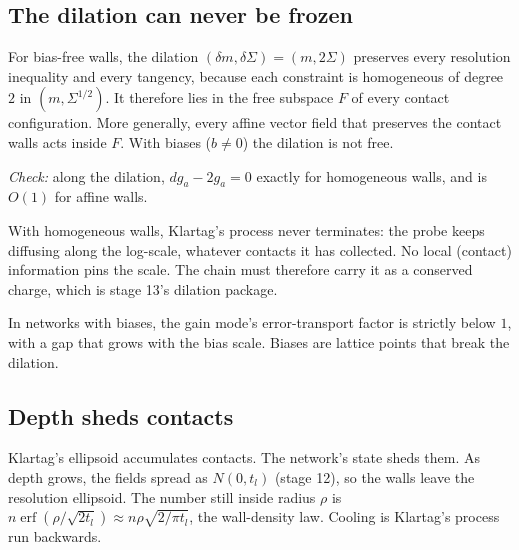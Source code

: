 \subsection{The dilation can never be frozen}
\begin{proposition}[proved]\label{prop:dilfree}
For bias-free walls, the dilation $(\delta m,\delta\Sigma)=(m,2\Sigma)$ preserves every resolution inequality and every tangency, because each
constraint is homogeneous of degree $2$ in $(m,\Sigma^{1/2})$. It therefore lies in the free subspace $F$ of every contact configuration.
More generally, every affine vector field that preserves the contact walls acts inside $F$. With biases ($b\ne0$) the dilation is not
free.
\end{proposition}
\emph{Check:} along the dilation, $dg_a-2g_a=0$ exactly for homogeneous walls, and is $O(1)$ for affine walls.
\begin{corollary}
With homogeneous walls, Klartag's process never terminates: the probe keeps diffusing along the log-scale, whatever contacts it has
collected. No local (contact) information pins the scale. The chain must therefore carry it as a conserved charge, which is stage 13's
dilation package.
\end{corollary}
\begin{conjecture}[falsifiable]
In networks with biases, the gain mode's error-transport factor is strictly below $1$, with a gap that grows with the bias scale.
Biases are lattice points that break the dilation.
\end{conjecture}

\subsection{Depth sheds contacts}
Klartag's ellipsoid accumulates contacts. The network's state sheds them. As depth grows, the fields spread as $N(0,t_l)$ (stage 12),
so the walls leave the resolution ellipsoid. The number still inside radius $\rho$ is $n\operatorname{erf}(\rho/\sqrt{2t_l})\approx n\rho\sqrt{2/\pi t_l}$, the
wall-density law. Cooling is Klartag's process run backwards.
